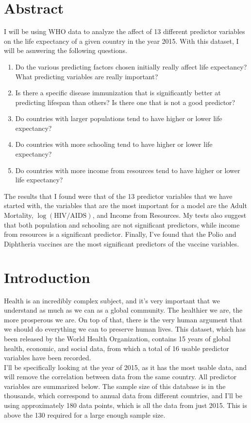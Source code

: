 \documentclass{article}
\renewcommand{\l}{\left}
\renewcommand{\r}{\right}
\begin{document}
\section*{Abstract}
	I will be using WHO data to analyze the affect of 13 different predictor variables on the life expectancy of a given country in the year 2015. With this dataset, I will be asnwering the following questions.
	\begin{enumerate}
		\item Do the various predicting factors chosen initially really affect life expectancy? What predicting variables are really important?
		\item Is there a specific disease immunization that is significantly better at predicting lifespan than others? Is there one that is not a good predictor?
		\item Do countries with larger populations tend to have higher or lower life expectancy?
		\item Do countries with more schooling tend to have higher or lower life expectancy?
		\item Do countries with more income from resources tend to have higher or lower life expectancy?
	\end{enumerate}
The results that I found were that  of the 13 predictor variables that we have started with, the variables that are the most important for a model are the Adult Mortality, $\log\l(\text{HIV/AIDS}\r)$, and Income from Resources. My tests also suggest that both population and schooling are not significant predictors, while income from resources is a significant predictor. Finally, I've found that the Polio and Diphtheria vaccines are the most significant predictors of the vaccine variables.
	\newpage
\section*{Introduction}

Health is an incredibly complex subject, and it's very important that we understand as much as we can as a global community. The healthier we are, the more prosperous we are. On top of that, there is the very human argument that we should do everything we can to preserve human lives. This dataset, which has been released by the World Health Organization, contains 15 years of global health, economic, and social data, from which a total of 16 usable predictor variables have been recorded. \\[3mm]

I'll be specifically looking at the year of 2015, as it has the most usable data, and will remove the correlation between data from the same country. All predictor variables are summarized below. The sample size of this database is in the thousands, which correspond to annual data from different countries, and I'll be using approximately 180 data points, which is all the data from just 2015. This is above the 130 required for a large enough sample size.
\end{document}
